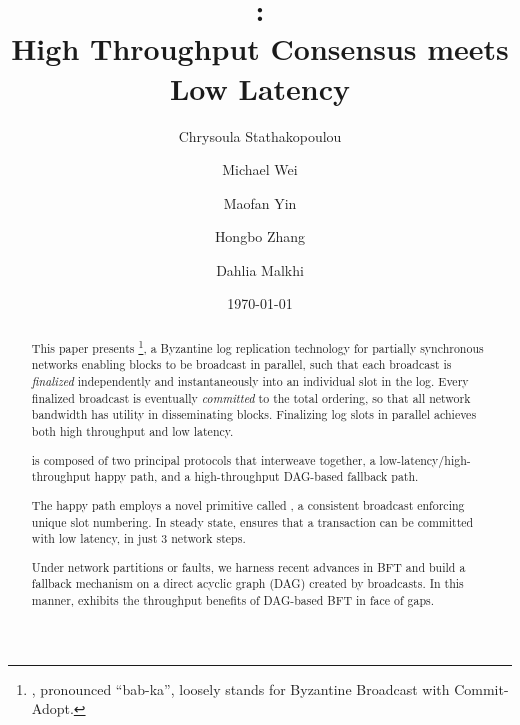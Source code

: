\documentclass[sigconf]{acmart}
\begin{document}
\normalem
\fancyhf{} %
\fancyhead{}
\fancyfoot[C]{\thepage}


\title{\textbf{\system:\\ High Throughput Consensus meets Low Latency}}

\author{Chrysoula Stathakopoulou}

\author{Michael Wei}

\author{Maofan Yin}

\author{Hongbo Zhang}

\author{Dahlia Malkhi}

\date{\today}

   
\begin{abstract}
This paper presents \system%
\footnote{\primitiveprefix, pronounced ``bab-ka'', loosely stands for Byzantine Broadcast with Commit-Adopt.},
a Byzantine log replication technology for partially synchronous networks enabling blocks to be broadcast in parallel, 
such that each broadcast is \emph{finalized} independently and instantaneously into an individual slot in the log.
Every finalized broadcast is eventually \emph{committed} to the total ordering, 
so that all network bandwidth has utility in disseminating blocks.
Finalizing log slots in parallel achieves both high throughput and low latency.

\system is composed of two principal protocols that interweave together, a low-latency/high-throughput happy path, and a high-throughput DAG-based fallback path.

The happy path employs a novel primitive called \primitive,
a consistent broadcast enforcing unique slot numbering.
In steady state, \primitive ensures that a transaction can be committed with low latency, in just 3 network steps.

Under network partitions or faults, 
we harness recent advances in BFT and build 
a fallback mechanism on a direct acyclic graph (DAG) created by \primitive broadcasts. 
In this manner, \system exhibits the throughput benefits of DAG-based BFT in face of gaps. 
\end{abstract}

\maketitle











\end{document}
